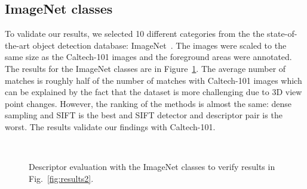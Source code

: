 \documentclass[10pt,journal,cspaper,compsoc]{IEEEtran}
\begin{document}
%
\subsection{ImageNet classes}
%
To validate our results, we selected 10 different categories from the
the state-of-the-art object detection database: ImageNet~\cite{imagenet}.
The images were scaled to the same size as the Caltech-101 images and
the foreground areas were annotated. The results for the ImageNet classes
are in Figure~\ref{fig:results2_imagenet}. The average number of matches
is roughly half of the number of matches with Caltech-101 images which
can be explained by the fact that the dataset is more challenging
due to 3D view point changes. However, the ranking of
the methods is almost the same: dense sampling and
SIFT is the best and SIFT detector and descriptor pair is the
worst. The results validate our findings with Caltech-101.
%
\begin{figure}[h]
\begin{center}
\\
\caption{Descriptor evaluation with the ImageNet classes to
verify results in Fig.~\ref{fig:results2}.\label{fig:results2_imagenet}}
\end{center}
\end{figure}
\end{document}
